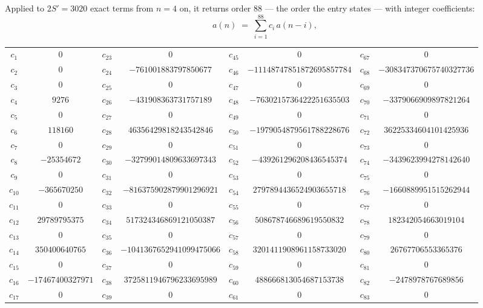 \documentclass[11pt,a4paper]{article}
\theoremstyle{plain}
\theoremstyle{definition}
\begin{document}
Applied to $2S'=3020$ exact terms from $n=4$ on, it returns order $88$ --- the
order the entry states --- with integer coefficients:
\[
a(n)\;=\;\sum_{i=1}^{88}c_i\,a(n-i),
\]
\begin{center}\small
\begin{tabular}{cccccccc}
$c_{1}$ & $0$ & $c_{23}$ & $0$ & $c_{45}$ & $0$ & $c_{67}$ & $0$ \\
$c_{2}$ & $0$ & $c_{24}$ & $-761001883797850677$ & $c_{46}$ & $-11148747851872695857784$ & $c_{68}$ & $-308347370675740327736$ \\
$c_{3}$ & $0$ & $c_{25}$ & $0$ & $c_{47}$ & $0$ & $c_{69}$ & $0$ \\
$c_{4}$ & $9276$ & $c_{26}$ & $-431908363731757189$ & $c_{48}$ & $-7630215736422251635503$ & $c_{70}$ & $-3379066909897821264$ \\
$c_{5}$ & $0$ & $c_{27}$ & $0$ & $c_{49}$ & $0$ & $c_{71}$ & $0$ \\
$c_{6}$ & $118160$ & $c_{28}$ & $46356429818243542846$ & $c_{50}$ & $-1979054879561788228676$ & $c_{72}$ & $36225334604101425936$ \\
$c_{7}$ & $0$ & $c_{29}$ & $0$ & $c_{51}$ & $0$ & $c_{73}$ & $0$ \\
$c_{8}$ & $-25354672$ & $c_{30}$ & $-32799014809633697343$ & $c_{52}$ & $-439261296208436545374$ & $c_{74}$ & $-3439623994278142640$ \\
$c_{9}$ & $0$ & $c_{31}$ & $0$ & $c_{53}$ & $0$ & $c_{75}$ & $0$ \\
$c_{10}$ & $-365670250$ & $c_{32}$ & $-816375902879901296921$ & $c_{54}$ & $2797894436524903655718$ & $c_{76}$ & $-1660889951515262944$ \\
$c_{11}$ & $0$ & $c_{33}$ & $0$ & $c_{55}$ & $0$ & $c_{77}$ & $0$ \\
$c_{12}$ & $29789795375$ & $c_{34}$ & $517324346869121050387$ & $c_{56}$ & $508678746689619550832$ & $c_{78}$ & $182342054663019104$ \\
$c_{13}$ & $0$ & $c_{35}$ & $0$ & $c_{57}$ & $0$ & $c_{79}$ & $0$ \\
$c_{14}$ & $350400640765$ & $c_{36}$ & $-1041367652941099475066$ & $c_{58}$ & $3201411908961158733020$ & $c_{80}$ & $26767706553365376$ \\
$c_{15}$ & $0$ & $c_{37}$ & $0$ & $c_{59}$ & $0$ & $c_{81}$ & $0$ \\
$c_{16}$ & $-17467400327971$ & $c_{38}$ & $3725811946796233695989$ & $c_{60}$ & $488666813054687153738$ & $c_{82}$ & $-2478978767689856$ \\
$c_{17}$ & $0$ & $c_{39}$ & $0$ & $c_{61}$ & $0$ & $c_{83}$ & $0$ \\

\end{tabular}
\end{center}
\end{document}
